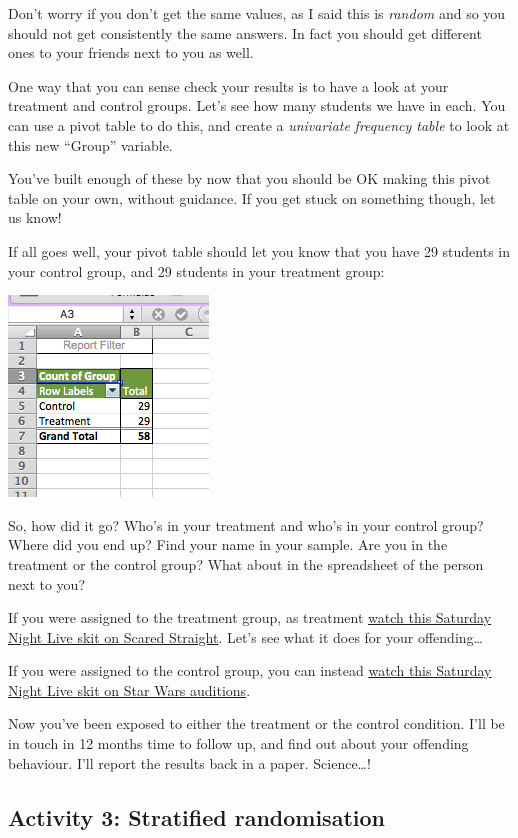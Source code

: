 \documentclass[]{book}
\theoremstyle{definition}
\theoremstyle{definition}
\theoremstyle{definition}
\theoremstyle{remark}
\begin{document}
Don't worry if you don't get the same values, as I said this is
\emph{random} and so you should not get consistently the same answers.
In fact you should get different ones to your friends next to you as
well.

One way that you can sense check your results is to have a look at your
treatment and control groups. Let's see how many students we have in
each. You can use a pivot table to do this, and create a
\emph{univariate} \emph{frequency table} to look at this new ``Group''
variable.

You've built enough of these by now that you should be OK making this
pivot table on your own, without guidance. If you get stuck on something
though, let us know!

If all goes well, your pivot table should let you know that you have 29
students in your control group, and 29 students in your treatment group:

\includegraphics{imgs/freq_groups.png}

So, how did it go? Who's in your treatment and who's in your control
group? Where did you end up? Find your name in your sample. Are you in
the treatment or the control group? What about in the spreadsheet of the
person next to you?

If you were assigned to the treatment group, as treatment
\href{https://www.youtube.com/watch?v=sw1vm_PO8ss}{watch this Saturday
Night Live skit on Scared Straight}. Let's see what it does for your
offending\ldots{}

If you were assigned to the control group, you can instead
\href{https://www.youtube.com/watch?v=-T_pjMr7-n0}{watch this Saturday
Night Live skit on Star Wars auditions}.

Now you've been exposed to either the treatment or the control
condition. I'll be in touch in 12 months time to follow up, and find out
about your offending behaviour. I'll report the results back in a paper.
Science\ldots{}!

\hypertarget{activity-3-stratified-randomisation}{%
\subsection{Activity 3: Stratified
randomisation}\label{activity-3-stratified-randomisation}}
\end{document}

